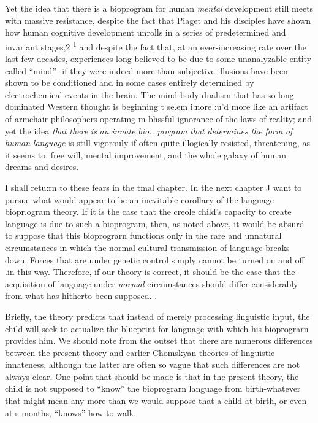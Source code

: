 Yet the idea that there is a bioprogram for human \textit{mental} de\-velopment still meets with massive resistance, despite the fact that Piaget and his disciples have shown how human cognitive development unrolls in a series of predetermined and invariant stages,2 \textsuperscript{1} and despite
the fact that, at an ever-increasing rate over the last few decades, experi\-ences long believed to be due to some unanalyzable entity called ``mind'' {}-if they were indeed more than subjective illusions{}-have been shown to be conditioned and in some cases entirely determined by electrochemical events in the brain. The mind-body dualism that has so long dominated Western thought is beginning t se.em i:nore :u'd more like an artifact of armchair philosophers operatmg m bhssful ignorance of the laws of reality; and yet the idea \textit{that} \textit{there} \textit{is} \textit{an} \textit{innate} \textit{bio}\textit{..} \textit{program} \textit{that} \textit{determines} \textit{the} \textit{form} \textit{of} \textit{human} \textit{language} is still vigorouly if often quite illogically resisted, threatening, as it seems to, free will, mental improvement, and the whole galaxy of human dreams and
desires.

I shall retu:rn to these fears in the tmal chapter. In the next chapter J want to pursue what would appear to be an inevitable corol\-lary of the language biopr.ogram theory. If it is the case that the creole child's capacity to create language is due to such a bioprogram, then, as noted above, it would be absurd to suppose that this bioprograrn functions only in the rare and unnatural circumstances in which the normal cultural transmission of language breaks down. Forces that are under genetic control simply cannot be turned on and off .in this way. Therefore, if our theory is correct, it should be the case that the acquisition of language under \textit{normal} circumstances should differ considerably from what has hitherto been supposed. .

Briefly, the theory predicts that instead of merely processing
linguistic input, the child will seek to actualize the blueprint for lan\-guage with which his bioprograrn provides him. We should note from the outset that there are numerous differences between the present theory and earlier Chomskyan theories of linguistic innateness, al\-though the latter are often so vague that such differences are not always clear. One point that should be made is that in the present theory, the child is not supposed to ``know'' the bioprograrn language from birth-whatever that might mean-any more than we would suppose that a child at birth, or even at s months, ``knows'' how to walk.

